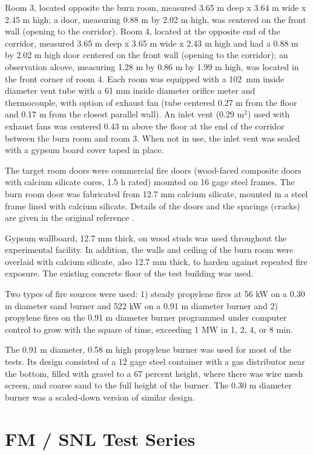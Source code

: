 Room 3, located opposite the burn room, measured 3.65 m deep x 3.64 m wide x 2.45 m high; a door, measuring 0.88 m by 2.02 m high, was centered on the front wall (opening to the corridor). Room 4, located at the opposite end of the corridor, measured 3.65 m deep x 3.65 m wide x 2.43 m high and had a 0.88 m by 2.02 m high door centered on the front wall (opening to the corridor); an observation alcove, measuring 1.28 m by 0.86 m by 1.99 m high, was located in the front corner of room 4. Each room was equipped with a 102~mm inside diameter vent tube with a 61 mm inside diameter orifice meter and thermocouple, with option of exhaust fan (tube centered 0.27 m from the floor and 0.17 m from the closest parallel wall). An inlet vent (0.29 m$^2$) used with exhaust fans was centered 0.43 m above the floor at the end of the corridor between the burn room and room 3. When not in use, the inlet vent was sealed with a gypsum board cover taped in place.

The target room doors were commercial fire doors (wood-faced composite doors with calcium silicate cores, 1.5 h rated) mounted on 16 gage steel frames. The burn room door was fabricated from 12.7 mm calcium silicate, mounted in a steel frame lined with calcium silicate. Details of the doors and the spacings (cracks) are given in the original reference \cite{Heskestad:1986}.

Gypsum wallboard, 12.7 mm thick, on wood studs was used throughout the experimental facility. In addition, the walls and ceiling of the burn room were overlaid with calcium silicate, also 12.7 mm thick, to harden against repeated fire exposure. The existing concrete floor of the test building was used.

Two types of fire sources were used: 1) steady propylene fires at 56 kW on a 0.30 m diameter sand burner and 522 kW on a 0.91 m diameter burner and 2) propylene fires on the 0.91 m diameter burner programmed under computer control to grow with the square of time, exceeding 1 MW in 1, 2, 4, or 8 min.

The 0.91 m diameter, 0.58 m high propylene burner was used for most of the tests. Its design consisted of a 12 gage steel container with a gas distributor near the bottom, filled with gravel to a 67 percent height, where there was wire mesh screen, and coarse sand to the full height of the burner. The 0.30 m diameter burner was a scaled-down version of similar design.

\section{FM / SNL Test Series}

